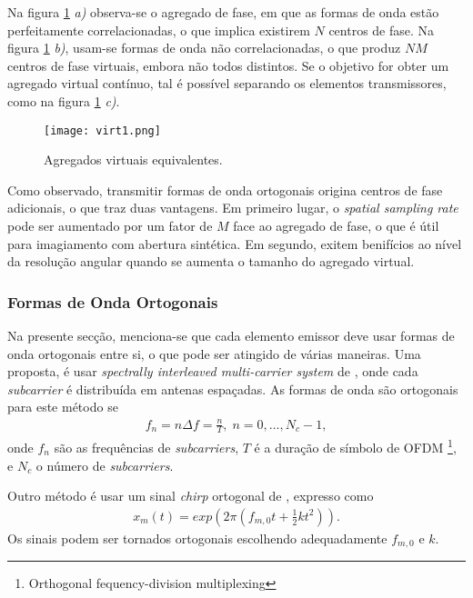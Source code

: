 \documentclass[purist,portuguese]{ist-report}
\begin{document}
Na figura \ref{fig:virt1} \emph{a)} observa-se o agregado de fase, em que as formas de onda estão perfeitamente correlacionadas, o que implica existirem $N$ centros de fase.
Na figura \ref{fig:virt1} \emph{b)}, usam-se formas de onda não correlacionadas, o que produz $NM$ centros de fase virtuais, embora não todos distintos.
Se o objetivo for obter um agregado virtual contínuo, tal é possível separando os elementos transmissores, como na figura \ref{fig:virt1} \emph{c)}. 

\begin{figure}[h]
  \centering
  \texttt{[image: virt1.png]}
  \caption{Agregados virtuais equivalentes.}
  \label{fig:virt1}
\end{figure}

Como observado, transmitir formas de onda ortogonais origina centros de fase adicionais, o que traz duas vantagens.
Em primeiro lugar, o \textit{spatial sampling rate} pode ser aumentado por um fator de $M$ face ao agregado de fase, o que é útil para imagiamento com abertura sintética.
Em segundo, exitem benifícios ao nível da resolução angular quando se aumenta o tamanho do agregado virtual.

\subsubsection{Formas de Onda Ortogonais}

Na presente secção, menciona-se que cada elemento emissor deve usar formas de onda ortogonais entre si, o que pode ser atingido de várias maneiras.
Uma proposta, é usar \textit{spectrally interleaved multi-carrier system} de \cite{sturm2013spectrally}, onde cada \textit{subcarrier} é distribuída em antenas espaçadas.
As formas de onda são ortogonais para este método se 
\begin{align}
  f_n = n\Delta f = \frac{n}{T}, \; n=0,\ldots,N_c -1,
  \label{eq:orth}
\end{align}
onde $f_n$ são as frequências de \textit{subcarriers}, $T$ é a duração de símbolo de OFDM \footnote{Orthogonal fequency-division multiplexing}, e $N_c$ o número de \textit{subcarriers}.

Outro método é usar um sinal \textit{chirp} ortogonal de \cite{chen2008mimo}, expresso como
\begin{align}
  x_m(t)= exp\left( 2\pi \left( f_{m,0}t+\frac{1}{2}kt^2 \right) \right).
  \label{eq:chirp}
\end{align}
Os sinais podem ser tornados ortogonais escolhendo adequadamente $f_{m,0}$ e $k$.
\end{document}
